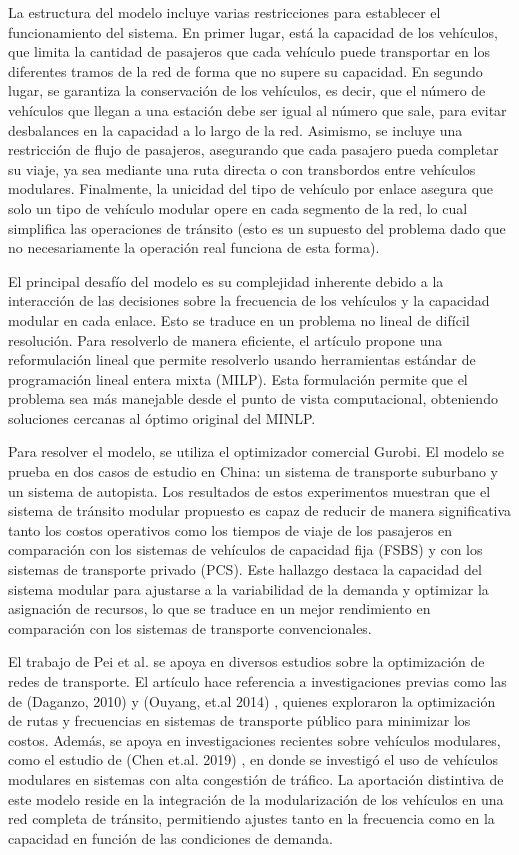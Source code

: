 \documentclass[preprint,11pt]{elsarticle}
\begin{document}
La estructura del modelo incluye varias restricciones para establecer el funcionamiento del sistema. En primer lugar, está la capacidad de los vehículos, que limita la cantidad de pasajeros que cada vehículo puede transportar en los diferentes tramos de la red de forma que no supere su capacidad. En segundo lugar, se garantiza la conservación de los vehículos, es decir, que el número de vehículos que llegan a una estación debe ser igual al número que sale, para evitar desbalances en la capacidad a lo largo de la red. Asimismo, se incluye una restricción de flujo de pasajeros, asegurando que cada pasajero pueda completar su viaje, ya sea mediante una ruta directa o con transbordos entre vehículos modulares. Finalmente, la unicidad del tipo de vehículo por enlace asegura que solo un tipo de vehículo modular opere en cada segmento de la red, lo cual simplifica las operaciones de tránsito (esto es un supuesto del problema dado que no necesariamente la operación real funciona de esta forma).

El principal desafío del modelo es su complejidad inherente debido a la interacción de las decisiones sobre la frecuencia de los vehículos y la capacidad modular en cada enlace. Esto se traduce en un problema no lineal de difícil resolución. Para resolverlo de manera eficiente, el artículo propone una reformulación lineal que permite resolverlo usando herramientas estándar de programación lineal entera mixta (MILP). Esta formulación permite que el problema sea más manejable desde el punto de vista computacional, obteniendo soluciones cercanas al óptimo original del MINLP.

Para resolver el modelo, se utiliza el optimizador comercial Gurobi. El modelo se prueba en dos casos de estudio en China: un sistema de transporte suburbano y un sistema de autopista. Los resultados de estos experimentos muestran que el sistema de tránsito modular propuesto es capaz de reducir de manera significativa tanto los costos operativos como los tiempos de viaje de los pasajeros en comparación con los sistemas de vehículos de capacidad fija (FSBS) y con los sistemas de transporte privado (PCS). Este hallazgo destaca la capacidad del sistema modular para ajustarse a la variabilidad de la demanda y optimizar la asignación de recursos, lo que se traduce en un mejor rendimiento en comparación con los sistemas de transporte convencionales.

El trabajo de Pei et al. se apoya en diversos estudios sobre la optimización de redes de transporte. El artículo hace referencia a investigaciones previas como las de (Daganzo, 2010) \textcite{daganzo2010} y (Ouyang, et.al 2014) \textcite{ouyang2014}, quienes exploraron la optimización de rutas y frecuencias en sistemas de transporte público para minimizar los costos. Además, se apoya en investigaciones recientes sobre vehículos modulares, como el estudio de (Chen et.al. 2019) \textcite{chen2019}, en donde se investigó el uso de vehículos modulares en sistemas con alta congestión de tráfico. La aportación distintiva de este modelo reside en la integración de la modularización de los vehículos en una red completa de tránsito, permitiendo ajustes tanto en la frecuencia como en la capacidad en función de las condiciones de demanda.
\end{document}
